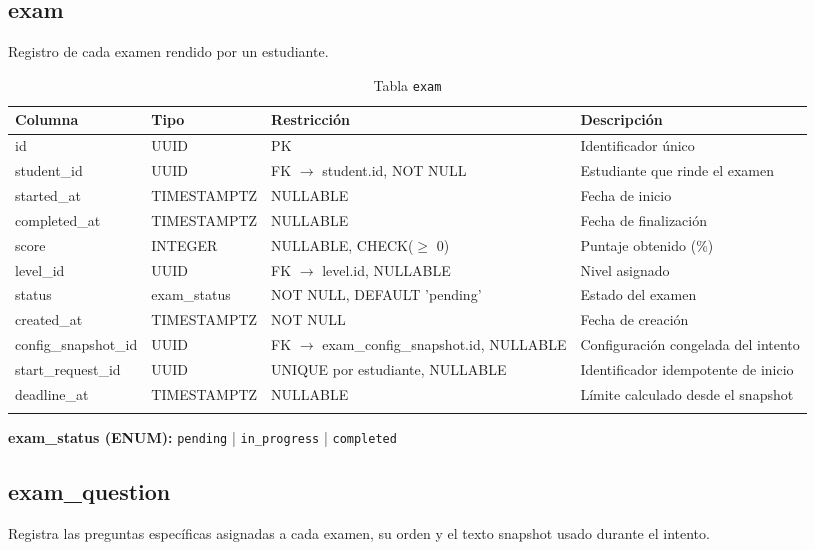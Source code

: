 \newpage

\subsection{exam}

Registro de cada examen rendido por un estudiante.

\begin{longtable}{l l l p{5cm}}
\toprule
\textbf{Columna} & \textbf{Tipo} & \textbf{Restricción} & \textbf{Descripción} \\
\midrule
\endhead
id & UUID & PK & Identificador único \\
student\_id & UUID & FK $\rightarrow$ student.id, NOT NULL & Estudiante que rinde el examen \\
started\_at & TIMESTAMPTZ & NULLABLE & Fecha de inicio \\
completed\_at & TIMESTAMPTZ & NULLABLE & Fecha de finalización \\
score & INTEGER & NULLABLE, CHECK($\ge$ 0) & Puntaje obtenido (\%) \\
level\_id & UUID & FK $\rightarrow$ level.id, NULLABLE & Nivel asignado \\
status & exam\_status & NOT NULL, DEFAULT 'pending' & Estado del examen \\
created\_at & TIMESTAMPTZ & NOT NULL & Fecha de creación \\
config\_snapshot\_id & UUID & FK $\rightarrow$ exam\_config\_snapshot.id, NULLABLE & Configuración congelada del intento \\
start\_request\_id & UUID & UNIQUE por estudiante, NULLABLE & Identificador idempotente de inicio \\
deadline\_at & TIMESTAMPTZ & NULLABLE & Límite calculado desde el snapshot \\
\bottomrule
\caption{Tabla \texttt{exam}}
\end{longtable}

\textbf{exam\_status (ENUM):} \texttt{pending} | \texttt{in\_progress} | \texttt{completed}

\subsection{exam\_question}

Registra las preguntas específicas asignadas a cada examen, su orden y el texto snapshot usado durante el intento.

